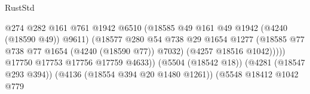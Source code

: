 \begin{lexlean}{RustStd}
\begin{coremodule}
{\begin{coremodule}
{{{{{{{{{{{{{{{{{{{{{{{{{{{{{{{{{{{                                                          @274
                                                          @282
                                                          @161
                                                          @761
                                                          @1942
                                                          @6510
                                                          (@18585
                                                            @49
                                                            @161
                                                            @49
                                                            @1942
                                                            (@4240 (@18590 @49))
                                                            @9611)
                                                          (@18577
                                                            @280
                                                            @54
                                                            @738
                                                            @29
                                                            @1654
                                                            @1277
                                                            (@18585
                                                              @77
                                                              @738
                                                              @77
                                                              @1654
                                                              (@4240 (@18590 @77))
                                                              @7032)
                                                            (@4257 @18516 @1042)))))
                                                    @17750
                                                    @17753
                                                    @17756
                                                    @17759
                                                    @4633))
                                                (@5504 (@18542 @18))
                                                (@4281 (@18547 @293 @394))
                                                (@4136 (@18554 @394 @20 @1480 @1261))
                                                (@5548
                                                  @18412
                                                  @1042
                                                  @779
}}}}}}}}}}}}}}}}}}}}}}}}}}}}}}}}}}}
\end{coremodule}}
\end{coremodule}
\end{lexlean}
